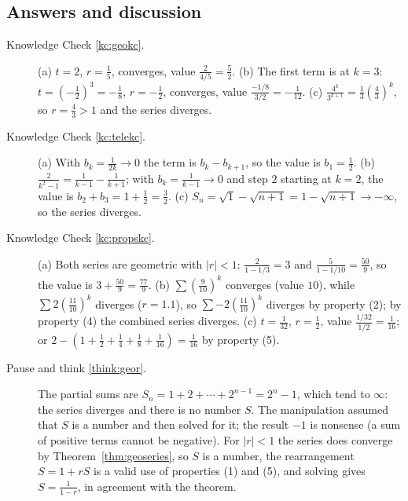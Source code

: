 \documentclass[11pt]{article}
\begin{document}
\subsection*{Answers and discussion}

\begin{description}
  \item[Knowledge Check \ref{kc:geokc}.] (a) $t=2$, $r=\frac15$, converges, value $\frac2{4/5}=\frac52$. (b) The first term is at $k=3$: $t=\left(-\frac12\right)^3=-\frac18$, $r=-\frac12$, converges, value $\frac{-1/8}{3/2}=-\frac1{12}$. (c) $\frac{4^k}{3^{k+1}}=\frac13\left(\frac43\right)^k$, so $r=\frac43>1$ and the series diverges.
  \item[Knowledge Check \ref{kc:telekc}.] (a) With $b_k=\frac1{2k}\to0$ the term is $b_k-b_{k+1}$, so the value is $b_1=\frac12$. (b) $\frac2{k^2-1}=\frac1{k-1}-\frac1{k+1}$; with $b_k=\frac1{k-1}\to0$ and step $2$ starting at $k=2$, the value is $b_2+b_3=1+\frac12=\frac32$. (c) $S_n=\sqrt1-\sqrt{n+1}=1-\sqrt{n+1}\to-\infty$, so the series diverges.
  \item[Knowledge Check \ref{kc:propskc}.] (a) Both series are geometric with $|r|<1$: $\frac2{1-1/3}=3$ and $\frac5{1-1/10}=\frac{50}9$, so the value is $3+\frac{50}9=\frac{77}9$. (b) $\sum\left(\frac9{10}\right)^k$ converges (value $10$), while $\sum2\left(\frac{11}{10}\right)^k$ diverges ($r=1.1$), so $\sum-2\left(\frac{11}{10}\right)^k$ diverges by property (2); by property (4) the combined series diverges. (c) $t=\frac1{32}$, $r=\frac12$, value $\frac{1/32}{1/2}=\frac1{16}$; or $2-\left(1+\frac12+\frac14+\frac18+\frac1{16}\right)=\frac1{16}$ by property (5).
  \item[Pause and think \ref{think:geor}.] The partial sums are $S_n=1+2+\cdots+2^{n-1}=2^n-1$, which tend to $\infty$: the series diverges and there is no number $S$. The manipulation assumed that $S$ is a number and then solved for it; the result $-1$ is nonsense (a sum of positive terms cannot be negative). For $|r|<1$ the series does converge by Theorem~\ref{thm:geoseries}, so $S$ is a number, the rearrangement $S=1+rS$ is a valid use of properties (1) and (5), and solving gives $S=\frac1{1-r}$, in agreement with the theorem.

\end{description}
\end{document}

